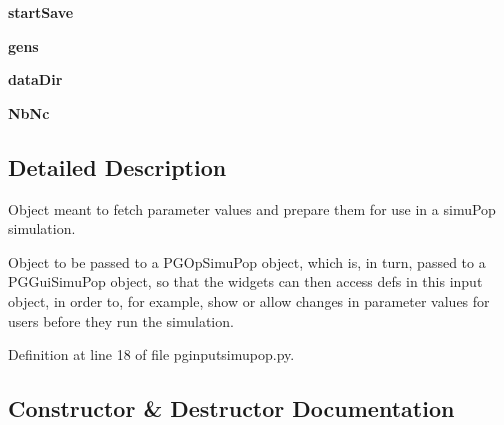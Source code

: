 \begin{DoxyCompactItemize}
\item 
{\bfseries start\+Save}\hypertarget{classnegui_1_1pginputsimupop_1_1PGInputSimuPop_a73ab30f9db93cfbd18580023886774d8}{}\label{classnegui_1_1pginputsimupop_1_1PGInputSimuPop_a73ab30f9db93cfbd18580023886774d8}

\item 
{\bfseries gens}\hypertarget{classnegui_1_1pginputsimupop_1_1PGInputSimuPop_aceb30da861b01f9f89e7b2d1fe78ba32}{}\label{classnegui_1_1pginputsimupop_1_1PGInputSimuPop_aceb30da861b01f9f89e7b2d1fe78ba32}

\item 
{\bfseries data\+Dir}\hypertarget{classnegui_1_1pginputsimupop_1_1PGInputSimuPop_a423a2c1ac08af8ba57663207700e5796}{}\label{classnegui_1_1pginputsimupop_1_1PGInputSimuPop_a423a2c1ac08af8ba57663207700e5796}

\item 
{\bfseries Nb\+Nc}\hypertarget{classnegui_1_1pginputsimupop_1_1PGInputSimuPop_a27c974f16a0d5a18fd811dafaa053bd9}{}\label{classnegui_1_1pginputsimupop_1_1PGInputSimuPop_a27c974f16a0d5a18fd811dafaa053bd9}

\end{DoxyCompactItemize}


\subsection{Detailed Description}
\begin{DoxyVerb}Object meant to fetch parameter values and prepare them for 
use in a simuPop simulation.  

Object to be passed to a PGOpSimuPop object, which is, in turn,
passed to a PGGuiSimuPop object, so that the widgets can then access
defs in this input object, in order to, for example, show or allow
changes in parameter values for users before they run the simulation.
\end{DoxyVerb}
 

Definition at line 18 of file pginputsimupop.\+py.



\subsection{Constructor \& Destructor Documentation}

